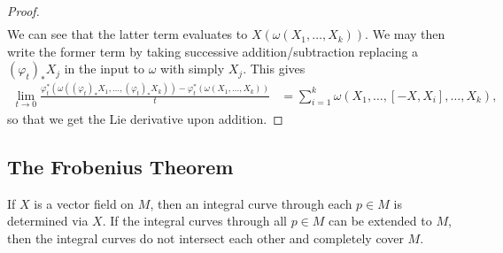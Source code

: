 \documentclass[10pt]{mypackage}
\begin{document}
\begin{proof}
\begin{align*}
  \end{align*}
  We can see that the latter term evaluates to $X\left( \omega\left( X_1,\dots,X_k \right) \right)$. We may then write the former term by taking successive addition/subtraction replacing a $\left( \varphi_{t} \right)_{\ast}X_j$ in the input to $\omega$ with simply $X_j$. This gives
  \begin{align*}
    \lim_{t\rightarrow 0} \frac{\varphi_t^{\ast}\left( \omega\left( \left( \varphi_t \right)_{\ast}X_1,\dots,\left( \varphi_t \right)_{\ast}X_k \right) \right) - \varphi_t^{\ast}\left( \omega\left( X_1,\dots,X_k \right) \right)}{t} &= \sum_{i=1}^{k} \omega\left( X_1,\dots,\left[ -X,X_i \right],\dots,X_k \right),
  \end{align*}
  so that we get the Lie derivative upon addition.
\end{proof}
\subsection{The Frobenius Theorem}%
If $X$ is a vector field on $M$, then an integral curve through each $p\in M$ is determined via $X$. If the integral curves through all $p\in M$ can be extended to $M$, then the integral curves do not intersect each other and completely cover $M$.\newline
\end{document}
